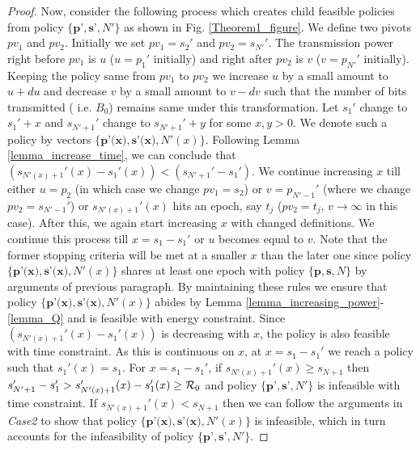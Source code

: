 \begin{proof}
Now, consider the following process which creates child feasible policies from policy $\{\textbf{p'},\textbf{s'},N'\}$ as shown in Fig. \ref{Theorem1_figure}. We define two pivots $pv_1$ and $pv_2$. Initially we set $pv_1=s_2'$ and $pv_2=s_{N'}'$. The transmission power right before $pv_1$ is $u$ ($u=p_1'$ initially) and right after $pv_2$ is $v$ ($v=p_{N'}'$ initially). Keeping the policy same from $pv_1$ to $pv_2$ we increase $u$ by a small amount to $u+du$ and decrease $v$ by a small amount to $v-dv$ such that the number of bits transmitted ( i.e. $B_0$) remains same under this transformation. Let $s_1'$ change to $s_1'+x$ and $s_{N'+1}'$ change to $s_{N'+1}'+y$ for some $x,y>0$. We denote such a policy by vectors $\{\textbf{p'(x)},\textbf{s'(x)},N'(x)\}$. Following Lemma \ref{lemma_increase_time}, we can conclude that $(s_{N'(x)+1}'(x)-s_1'(x))<(s_{N'+1}'-s_1')$. We continue increasing $x$ till either $u=p_2$ (in which case we change $pv_1=s_2$) or $v=p_{N'-1}'$ (where we change $pv_2=s_{N'-1}'$) or $s_{N'(x)+1}'(x)$ hits an epoch, say $t_j$ ($pv_2=t_j$, $v\rightarrow\infty$ in this case). After this, we again start increasing $x$ with changed definitions. We continue this process till $x=s_1-s_1'$  or $u$ becomes equal to $v$. Note that the former stopping criteria will be met at a smaller $x$ than the later one since policy $\{\textbf{p'(x)},\textbf{s'(x)},N'(x)\}$ shares at least one epoch with policy $\{\textbf{p},\textbf{s},N\}$ by arguments of previous paragraph. By maintaining these rules we ensure that policy $\{\textbf{p'(x)},\textbf{s'(x)},N'(x)\}$ abides by Lemma \ref{lemma_increasing_power}-\ref{lemma_Q} and is feasible with energy constraint. Since $\left( s_{N'(x)+1}'(x)-s_1'(x)\right)$ is decreasing with $x$, the policy is also feasible with time constraint. As this is continuous on $x$, at $x=s_1-s_1'$ we reach a policy such that $s_1'(x)=s_1$. For $x=s_1-s_1'$, if $s_{N'(x)+1}'(x)\ge s_{N+1}$ then $s_{N'+1}'-s_1'>s_{N'(x)+1}'(x)-s_1'(x)\ge \mathcal{R}_0$ and policy $\{\textbf{p'},\textbf{s'},N'\}$ is infeasible with time constraint. If $s_{N'(x)+1}'(x)< s_{N+1}$ then we can follow the arguments in \textit{Case2} to show that policy $\{\textbf{p'(x)},\textbf{s'(x)},N'(x)\}$ is infeasible, which in turn accounts for the infeasibility of policy $\{\textbf{p'},\textbf{s'},N'\}$.
\end{proof}

























